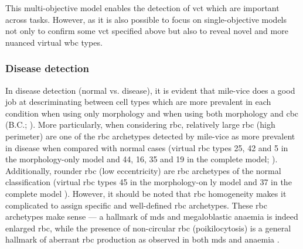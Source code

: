 \begin{figure}[!ht]
    \label{fig:rbc-mo-examples}
\end{figure}

This multi-objective model enables the detection of \ac{vct} which are important across tasks. However, as it is also possible to focus on single-objective models not only to confirm some \ac{vct} specified above but also to reveal novel and more nuanced virtual \ac{wbc} types.

\subsubsection{Disease detection} 

In disease detection (normal vs. disease), it is evident that \ac{mile-vice} does a good job at descriminating between cell types which are more prevalent in each condition when using only morphology and when using both morphology and \ac{cbc} (B.C.; ). More particularly, when considering \ac{rbc}, relatively large \ac{rbc} (high perimeter) are one of the \ac{rbc} archetypes detected by \ac{mile-vice} as more prevalent in disease when compared with normal cases (virtual \ac{rbc} types 25, 42 and 5 in the morphology-only model and 44, 16, 35 and 19 in the complete model; ). Additionally, rounder \ac{rbc} (low eccentricity) are \ac{rbc} archetypes of the normal classification (virtual \ac{rbc} types 45 in the morphology-on ly model and 37 in the complete model ). However, it should be noted that \ac{rbc} homogeneity makes it complicated to assign specific and well-defined \ac{rbc} archetypes. These \ac{rbc} archetypes make sense --- a hallmark of \ac{mds} and megaloblastic anaemia is indeed enlarged \ac{rbc}, while the presence of non-circular \ac{rbc} (poikilocytosis) is a general hallmark of aberrant \ac{rbc} production as observed in both \ac{mds} and anaemia \cite{Ford2013-nd}. 

\begin{figure}[!ht]
    \label{fig:mile-vice-vcq-so-disease-detection}
\end{figure}

